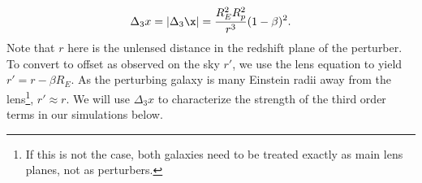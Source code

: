 \begin{equation}
\Delta_3 x = | \Delta_3 \x| = \frac{R_E^2 R_p^2}{r^3} (1 - \beta)^2. 
\label{eq:backgroundd3x}
\end{equation}
Note that $r$ here is the unlensed distance in the redshift plane of the perturber. To convert to offset as observed on the sky $r'$, we use the lens equation to yield $r' = r - \beta R_E$. As the perturbing galaxy is many Einstein radii away from the lens\footnote{If this is not the case, both galaxies need to be treated exactly as main lens planes, not as perturbers.}, $r' \approx r$. We will use $\Delta_3 x$ to characterize the strength of the third order terms in our simulations below.
  
  
  